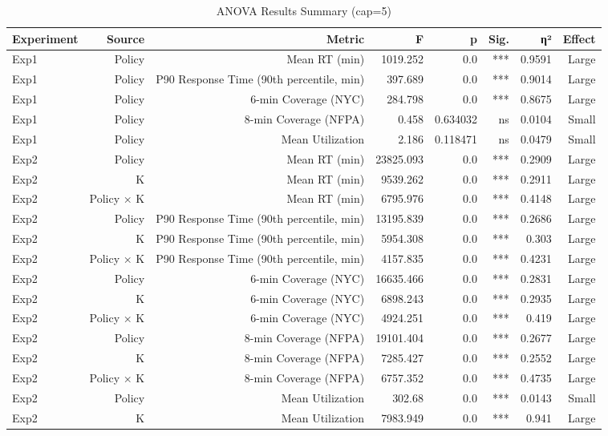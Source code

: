\begin{table}[htbp]
\centering
\caption{ANOVA Results Summary (cap=5)}
\label{tab:anova}
\begin{tabular}{lrrrrrrr}
\toprule
Experiment & Source & Metric & F & p & Sig. & η² & Effect \\
\midrule
Exp1 & Policy & Mean RT (min) & 1019.252 & 0.0 & *** & 0.9591 & Large \\
Exp1 & Policy & P90 Response Time (90th percentile, min) & 397.689 & 0.0 & *** & 0.9014 & Large \\
Exp1 & Policy & 6-min Coverage (NYC) & 284.798 & 0.0 & *** & 0.8675 & Large \\
Exp1 & Policy & 8-min Coverage (NFPA) & 0.458 & 0.634032 & ns & 0.0104 & Small \\
Exp1 & Policy & Mean Utilization & 2.186 & 0.118471 & ns & 0.0479 & Small \\
Exp2 & Policy & Mean RT (min) & 23825.093 & 0.0 & *** & 0.2909 & Large \\
Exp2 & K & Mean RT (min) & 9539.262 & 0.0 & *** & 0.2911 & Large \\
Exp2 & Policy × K & Mean RT (min) & 6795.976 & 0.0 & *** & 0.4148 & Large \\
Exp2 & Policy & P90 Response Time (90th percentile, min) & 13195.839 & 0.0 & *** & 0.2686 & Large \\
Exp2 & K & P90 Response Time (90th percentile, min) & 5954.308 & 0.0 & *** & 0.303 & Large \\
Exp2 & Policy × K & P90 Response Time (90th percentile, min) & 4157.835 & 0.0 & *** & 0.4231 & Large \\
Exp2 & Policy & 6-min Coverage (NYC) & 16635.466 & 0.0 & *** & 0.2831 & Large \\
Exp2 & K & 6-min Coverage (NYC) & 6898.243 & 0.0 & *** & 0.2935 & Large \\
Exp2 & Policy × K & 6-min Coverage (NYC) & 4924.251 & 0.0 & *** & 0.419 & Large \\
Exp2 & Policy & 8-min Coverage (NFPA) & 19101.404 & 0.0 & *** & 0.2677 & Large \\
Exp2 & K & 8-min Coverage (NFPA) & 7285.427 & 0.0 & *** & 0.2552 & Large \\
Exp2 & Policy × K & 8-min Coverage (NFPA) & 6757.352 & 0.0 & *** & 0.4735 & Large \\
Exp2 & Policy & Mean Utilization & 302.68 & 0.0 & *** & 0.0143 & Small \\
Exp2 & K & Mean Utilization & 7983.949 & 0.0 & *** & 0.941 & Large \\

\end{tabular}
\end{table}
